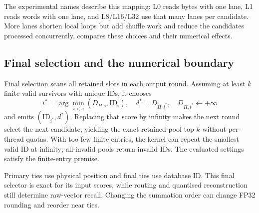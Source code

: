 The experimental names describe this mapping: L0 reads bytes with one
lane, L1 reads words with one lane, and L8/L16/L32 use that many lanes
per candidate. More lanes shorten local loops but add shuffle work and
reduce the candidates processed concurrently.  compares
these choices and their numerical effects.

\subsection{Final selection and the numerical boundary}

Final selection scans all retained slots in each output round. Assuming
at least $k$ finite valid survivors with unique IDs, it chooses
\[
 i^*=\arg\min_{i<c}(D_{H,i},\mathrm{ID}_i),\quad d^*=D_{H,i^*},\quad
 D_{H,i^*}\leftarrow+\infty
\]
and emits $(\mathrm{ID}_{i^*},d^*)$. Replacing that score by infinity
makes the next round select the next candidate, yielding the exact
retained-pool top-$k$ without per-thread quotas. With too few finite
entries, the kernel can repeat the smallest valid ID at infinity;
all-invalid pools return invalid IDs. The evaluated settings satisfy
the finite-entry premise.

Primary ties use physical position and final ties use database ID.
This final selector is exact for its input scores, while routing and
quantised reconstruction still determine raw-vector recall. Changing
the summation order can change FP32 rounding and reorder near ties.

